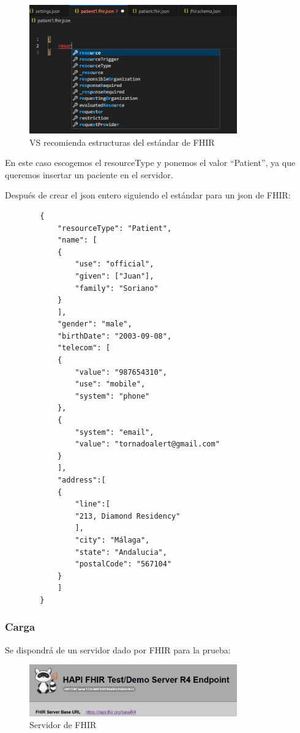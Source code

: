 \documentclass[12pt, a4paper, twoside]{article}
\begin{document}
	\begin{figure}[h!]
		\centering
		\includegraphics[width=0.8\textwidth]{image/4.png}
		\caption{VS recomienda estructuras del estándar de FHIR}
		\label{fig:4}
	\end{figure}
	\vspace{5cm}
	
	En este caso escogemos el resourceType y ponemos el valor “Patient”, ya que queremos insertar un paciente en el servidor.
	
	Después de crear el json entero siguiendo el estándar para un json de FHIR:
	\vspace{0.3cm}
	
	\begin{verbatim}
		{
			"resourceType": "Patient",
			"name": [
			{
				"use": "official",
				"given": ["Juan"],
				"family": "Soriano"
			}
			],
			"gender": "male",
			"birthDate": "2003-09-08",
			"telecom": [
			{
				"value": "987654310",
				"use": "mobile",
				"system": "phone"
			},
			{
				"system": "email",
				"value": "tornadoalert@gmail.com"
			}
			],
			"address":[
			{
				"line":[
				"213, Diamond Residency"
				],
				"city": "Málaga",
				"state": "Andalucia",
				"postalCode": "567104"
			}
			]
		}
	\end{verbatim}
	\cite{HL7Patient}
	
	\subsubsection{Carga}
	
	Se dispondrá de un servidor dado por FHIR para la prueba:
	
	\begin{figure}[h!]
		\centering
		\includegraphics[width=0.8\textwidth]{image/5.png}
		\caption{Servidor de FHIR \cite{HAPI_FHIR}}
		\label{fig:5}
	\end{figure}
	
\end{document}
